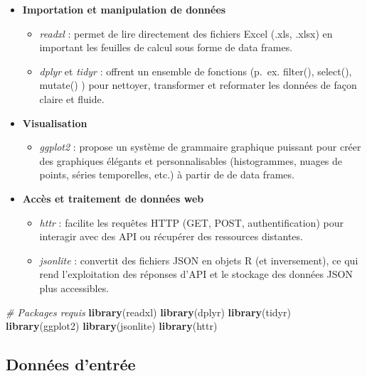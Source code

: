 \documentclass[
]{article}
\newenvironment{Shaded}{\begin{snugshade}}{\end{snugshade}}
\newcommand{\CommentTok}[1]{\textcolor[rgb]{0.56,0.35,0.01}{\textit{#1}}}
\newcommand{\FunctionTok}[1]{\textcolor[rgb]{0.13,0.29,0.53}{\textbf{#1}}}
\newcommand{\NormalTok}[1]{#1}
\providecommand{\tightlist}{%
  \setlength{\itemsep}{0pt}\setlength{\parskip}{0pt}}
\begin{document}
\begin{itemize}
\item
  \textbf{Importation et manipulation de données}

  \begin{itemize}
  \item
    \emph{readxl} : permet de lire directement des fichiers Excel (.xls,
    .xlsx) en important les feuilles de calcul sous forme de data
    frames.
  \item
    \emph{dplyr} et \emph{tidyr} : offrent un ensemble de fonctions
    (p.~ex. filter(), select(), mutate() ) pour nettoyer, transformer et
    reformater les données de façon claire et fluide.
  \end{itemize}
\item
  \textbf{Visualisation}

  \begin{itemize}
  \tightlist
  \item
    \emph{ggplot2} : propose un système de grammaire graphique puissant
    pour créer des graphiques élégants et personnalisables
    (histogrammes, nuages de points, séries temporelles, etc.) à partir
    de de data frames.
  \end{itemize}
\item
  \textbf{Accès et traitement de données web}

  \begin{itemize}
  \item
    \emph{httr} : facilite les requêtes HTTP (GET, POST,
    authentification) pour interagir avec des API ou récupérer des
    ressources distantes.
  \item
    \emph{jsonlite} : convertit des fichiers JSON en objets R (et
    inversement), ce qui rend l'exploitation des réponses d'API et le
    stockage des données JSON plus accessibles.
  \end{itemize}
\end{itemize}

\begin{Shaded}
\begin{Highlighting}[]
\CommentTok{\# Packages requis}
\FunctionTok{library}\NormalTok{(readxl)}
\FunctionTok{library}\NormalTok{(dplyr)}
\FunctionTok{library}\NormalTok{(tidyr)}
\FunctionTok{library}\NormalTok{(ggplot2)}
\FunctionTok{library}\NormalTok{(jsonlite)}
\FunctionTok{library}\NormalTok{(httr)}
\end{Highlighting}
\end{Shaded}

\subsection{Données d'entrée}\label{donnuxe9es-dentruxe9e}
\end{document}
